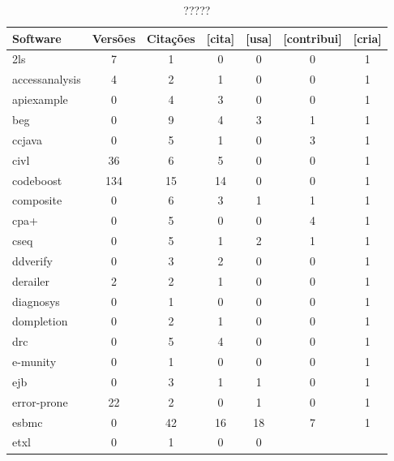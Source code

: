 
%


\begin{table}[H]
\caption{?????}
\centering
\begin{tabular}{| l | c | c | c | c | c | c |}
  \hline
  Software & Versões & Citações & [cita] & [usa] & [contribui] & [cria] \\
  \hline
  2ls
  &
  7
  &
  1
  &
  0
  &
  0
  &
  0
  &
  1
  \\
  accessanalysis
  &
  4
  &
  2
  &
  1
  &
  0
  &
  0
  &
  1
  \\
  apiexample
  &
  0
  &
  4
  &
  3
  &
  0
  &
  0
  &
  1
  \\
  beg
  &
  0
  &
  9
  &
  4
  &
  3
  &
  1
  &
  1
  \\
  ccjava
  &
  0
  &
  5
  &
  1
  &
  0
  &
  3
  &
  1
  \\
  civl
  &
  36
  &
  6
  &
  5
  &
  0
  &
  0
  &
  1
  \\
  codeboost
  &
  134
  &
  15
  &
  14
  &
  0
  &
  0
  &
  1
  \\
  composite
  &
  0
  &
  6
  &
  3
  &
  1
  &
  1
  &
  1
  \\
  cpa+
  &
  0
  &
  5
  &
  0
  &
  0
  &
  4
  &
  1
  \\
  cseq
  &
  0
  &
  5
  &
  1
  &
  2
  &
  1
  &
  1
  \\
  ddverify
  &
  0
  &
  3
  &
  2
  &
  0
  &
  0
  &
  1
  \\
  derailer
  &
  2
  &
  2
  &
  1
  &
  0
  &
  0
  &
  1
  \\
  diagnosys
  &
  0
  &
  1
  &
  0
  &
  0
  &
  0
  &
  1
  \\
  dompletion
  &
  0
  &
  2
  &
  1
  &
  0
  &
  0
  &
  1
  \\
  drc
  &
  0
  &
  5
  &
  4
  &
  0
  &
  0
  &
  1
  \\
  e-munity
  &
  0
  &
  1
  &
  0
  &
  0
  &
  0
  &
  1
  \\
  ejb
  &
  0
  &
  3
  &
  1
  &
  1
  &
  0
  &
  1
  \\
  error-prone
  &
  22
  &
  2
  &
  0
  &
  1
  &
  0
  &
  1
  \\
  esbmc
  &
  0
  &
  42
  &
  16
  &
  18
  &
  7
  &
  1
  \\
  etxl
  &
  0
  &
  1
  &
  0
  &
  0

\end{tabular}
\end{table}
